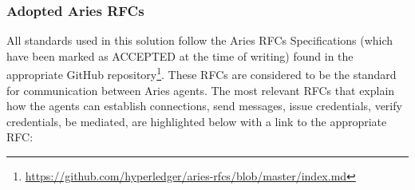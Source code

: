\fi

\subsubsection{Adopted Aries RFCs}
\label{subsubsec:adopted_aries_rfcs}

All standards used in this solution follow the Aries RFCs Specifications (which have been marked as ACCEPTED at the time of writing) found in the appropriate GitHub repository\footnote{\url{https://github.com/hyperledger/aries-rfcs/blob/master/index.md}}. These RFCs are considered to be the standard for communication between Aries agents. The most relevant RFCs that explain how the agents can establish connections, send messages, issue credentials, verify credentials, be mediated, are highlighted below with a link to the appropriate RFC:

